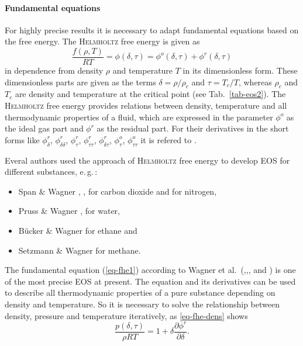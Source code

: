 \paragraph {Fundamental equations}			
For highly precise results it is necessary to adapt fundamental equations based on the free energy. The \textsc{Helmholtz} free energy is given as
%
\begin{equation}
\frac{f(\rho,T)}{RT}=\phi(\delta,\tau)=\phi^{o}(\delta,\tau)+\phi^{r}(\delta,\tau)
\label{eq-fhe1}
\end{equation}
in dependence from density $\rho$ and temperature $T$ in its dimensionless form. These dimensionless parts are given as the terms $\delta=\rho/\rho_c$ and $\tau=T_c/T$, whereas $\rho_c$ and $T_c$ are density and temperature at the critical point (see Tab.~\ref{tab-eos2}).  The \textsc{Helmholtz} free energy provides relations between density, temperature and all thermodynamic properties of a fluid, which are expressed in the parameter $\phi^{o}$ as the ideal gas part and $\phi^{r}$ as the residual part. For their derivatives in the short forms like
$\phi^r_\delta$,\hspace{0.1cm} 
$\phi^r_{\delta\delta}$,\hspace{0.1cm} 
$\phi^r_\tau$,\hspace{0.1cm} 
$\phi^r_{\tau\tau}$,\hspace{0.1cm} 
$\phi^r_{\delta\tau}$,\hspace{0.1cm}
$\phi^o_\tau$,\hspace{0.1cm} 
$\phi^o_{\tau\tau}$
it is refered to \cite{SpaWag:96}.

Everal authors used the approach of \textsc{Helmholtz} free energy to develop EOS for different substances, e.\,g.\,:
%
\begin{itemize}
\item {Span \& Wagner} \cite{SpaWag:96}, \cite{Spa:93}, \cite{SpaLem:00} for carbon dioxide and for nitrogen,
\vspace{-2mm}
\item {Pruss \& Wagner} \cite{PruWag:95}, \cite{WagPru:02} for water,
\vspace{-2mm}
\item {B\"ucker \& Wagner} \cite{BueWag:06} for ethane and
\vspace{-2mm}
\item {Setzmann \& Wagner} \cite{SetWag:91} for methane.
\end{itemize}

The fundamental equation (\ref{eq-fhe1}) according to {Wagner} et al.\ (\cite{SpaWag:96},\cite{PruWag:95},\cite{BueWag:06}, and \cite{SetWag:91}) is one of the most precise EOS at present. The equation and its derivatives can be used to describe all thermodynamic properties of a pure substance depending on density and temperature. So it is necessary to solve the relationship between density, pressure and temperature iteratively, as \eqref{eq-fhe-dens} shows
%
\begin{equation}
\frac{p(\delta,\tau)}{\rho RT}=1+\delta \frac{\partial \phi^r}{\partial \delta}.
\label{eq-fhe-dens}
\end{equation}

